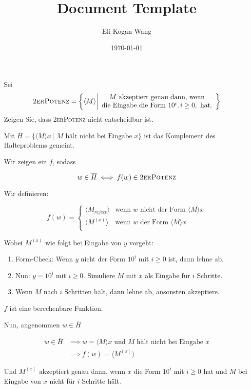 \documentclass[a4paper,12pt]{article}
\title{Document Template}
\author{Eli Kogan-Wang}
\date{\today}
\begin{document}
Sei
\[ \textsc{2erPotenz}=\left\{\langle M\rangle \middle| \begin{array}{c}M\text{ akzeptiert genau dann, wenn} \\ \text{die Eingabe die Form }10^i, i\geq 0,\text{ hat.} \end{array}\right\} \]
Zeigen Sie, dass \textsc{2erPotenz} nicht entscheidbar ist.

\vspace{5cm}

Mit $\overline{H}=\{\langle M\rangle x\mid M\text{ hält nicht bei Eingabe }x\}$ ist das Komplement des Halteproblems gemeint.

Wir zeigen ein $f$, sodass

$$w\in \overline{H}\iff f(w)\in \textsc{2erPotenz}$$

Wir definieren:

$$f(w)=\begin{cases}
    \langle M_{reject}\rangle & \text{wenn }w\text{ nicht der Form }\langle M\rangle x \\
    \langle M^{(x)}\rangle    & \text{wenn }w\text{ der Form }\langle M\rangle x       \\
  \end{cases}$$

Wobei $M^{(x)}$ wie folgt bei Eingabe von $y$ vorgeht:

\begin{enumerate}
  \item Form-Check: Wenn $y$ nicht der Form $10^i$ mit $i\geq 0$ ist, dann lehne ab.
  \item Nun: $y=10^i$ mit $i\geq 0$. Simuliere $M$ mit $x$ als Eingabe für $i$ Schritte.
  \item Wenn $M$ nach $i$ Schritten hält, dann lehne ab, ansonsten akzeptiere.
\end{enumerate}

$f$ ist eine berechenbare Funktion.

Nun, angenommen $w\in\overline{H}$

$$\begin{aligned}
    w\in \overline{H} & \implies w=\langle M\rangle x \text{ und } M\text{ hält nicht bei Eingabe }x \\
                      & \implies f(w)=\langle M^{(x)}\rangle\end{aligned}$$

Und $M^{(x)}$ akzeptiert genau dann, wenn $x$ die Form $10^i$ mit $i\geq 0$ hat und $M$ bei Eingabe von $x$ nicht für $i$ Schritte hält.
\end{document}
